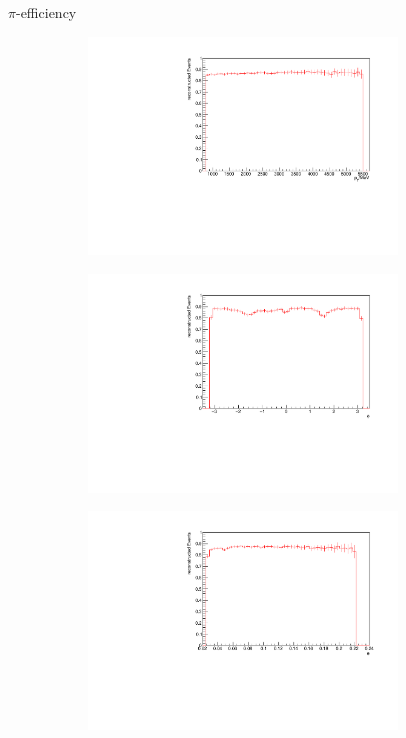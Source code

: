 \documentclass[11pt]{beamer}
\begin{document}
\begin{frame}{$\pi$-efficiency}
\begin{figure}
\begin{subfigure}{0.45\textwidth}
\includegraphics[width=0.9\textwidth]{up_pdf/single/pos/h_pt_reco_Pi_pos.pdf}
\end{subfigure}
\begin{subfigure}{0.45\textwidth}
\includegraphics[width=0.9\textwidth]{up_pdf/single/pos/h_phi_reco_Pi_pos.pdf}
\end{subfigure}
\begin{subfigure}{0.45\textwidth}
\includegraphics[width=0.9\textwidth]{up_pdf/single/pos/h_theta_reco_Pi_pos.pdf}

\end{subfigure}
\end{figure}
\end{frame}
\end{document}
